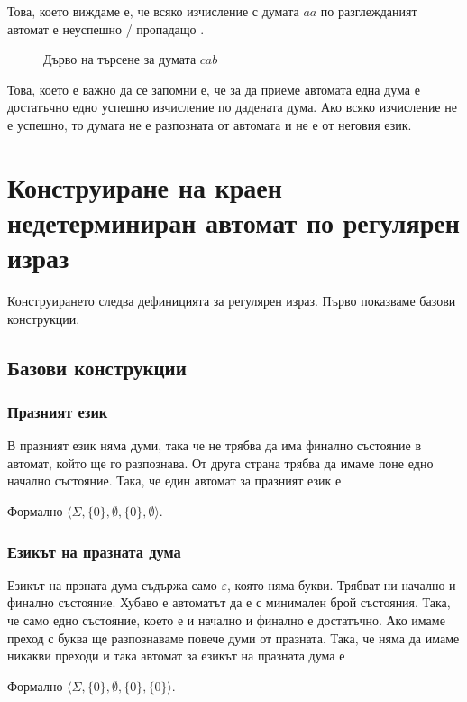 \documentclass[12pt]{article}
\begin{document}
Това, което виждаме е, че всяко изчисление с думата \(aa\) по разглежданият автомат е неуспешно / пропадащо .

\begin{figure}[H]
\centering
{}
\caption{Дърво на търсене за думата $cab$}
\end{figure}

Това, което е важно да се запомни е, че за да приеме автомата една дума е достатъчно едно успешно изчисление по дадената дума.
Ако всяко изчисление не е успешно, то думата не е разпозната от автомата и не е от неговия език.

\section{Конструиране на краен недетерминиран автомат по регулярен израз}
Конструирането следва дефиницията за регулярен израз.
Първо показваме базови конструкции.

\subsection{Базови конструкции}

\subsubsection{Празният език}
В празният език няма думи, така че не трябва да има финално състояние в автомат, който ще го разпознава.
От друга страна трябва да имаме поне едно начално състояние. Така, че един автомат за празният език е
\begin{center}
\end{center}
Формално \(\langle \Sigma, \{0\}, \emptyset, \{0\}, \emptyset \rangle\).

\subsubsection{Езикът на празната дума}
Езикът на прзната дума съдържа само \(\varepsilon\), която няма букви.
Трябват ни начално и финално състояние.
Хубаво е автоматът да е с минимален брой състояния.
Така, че само едно състояние, което е и начално и финално е достатъчно.
Ако имаме преход с буква ще разпознаваме повече думи от празната.
Така, че няма да имаме никакви преходи и така автомат за езикът на празната дума е
\begin{center}
\end{center}
Формално \(\langle \Sigma, \{0\}, \emptyset, \{0\}, \{0\} \rangle\).
\end{document}
